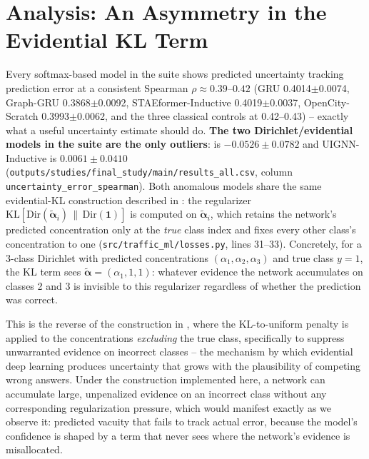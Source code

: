 \section{Analysis: An Asymmetry in the Evidential KL Term}
\label{sec:analysis}

Every softmax-based model in the suite shows predicted uncertainty tracking prediction error at a
consistent Spearman $\rho\approx0.39$--$0.42$ (GRU 0.4014$\pm$0.0074, Graph-GRU 0.3868$\pm$0.0092,
STAEformer-Inductive 0.4019$\pm$0.0037, OpenCity-Scratch 0.3993$\pm$0.0062, and the three classical
controls at 0.42--0.43) -- exactly what a useful uncertainty estimate should do.
\textbf{The two Dirichlet/evidential models in the suite are the only outliers}: \methodname{} is
$-0.0526\pm0.0782$ and UIGNN-Inductive is $0.0061\pm0.0410$
(\texttt{outputs/studies/final\_study/main/results\_all.csv},
column \texttt{uncertainty\_error\_spearman}). Both anomalous models share the same evidential-KL
construction described in : the regularizer
$\mathrm{KL}[\mathrm{Dir}(\tilde{\boldsymbol\alpha}_i)\,\|\,\mathrm{Dir}(\mathbf{1})]$ is computed
on $\tilde{\boldsymbol\alpha}_i$, which retains the network's predicted concentration only at the
\emph{true} class index and fixes every other class's concentration to one
(\texttt{src/traffic\_ml/losses.py}, lines 31--33). Concretely, for a 3-class Dirichlet with
predicted concentrations $(\alpha_1,\alpha_2,\alpha_3)$ and true class $y=1$, the KL term sees
$\tilde{\boldsymbol\alpha}=(\alpha_1,1,1)$: whatever evidence the network accumulates on classes 2
and 3 is invisible to this regularizer regardless of whether the prediction was correct.

This is the reverse of the construction in \citet{sensoy2018evidential}, where the KL-to-uniform
penalty is applied to the concentrations \emph{excluding} the true class, specifically to suppress
unwarranted evidence on incorrect classes -- the mechanism by which evidential deep learning
produces uncertainty that grows with the plausibility of competing wrong answers. Under the
construction implemented here, a network can accumulate large, unpenalized evidence on an incorrect
class without any corresponding regularization pressure, which would manifest exactly as we observe
it: predicted vacuity that fails to track actual error, because the model's confidence is shaped by
a term that never sees where the network's evidence is misallocated.

